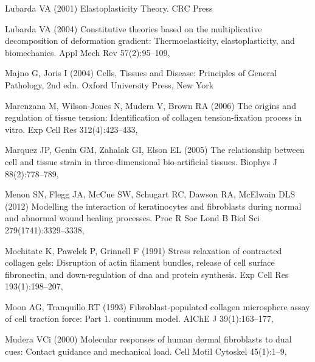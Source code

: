 \begin{thebibliography}{124}
Lubarda VA (2001) Elastoplasticity Theory. CRC Press

Lubarda VA (2004) Constitutive theories based on the multiplicative
  decomposition of deformation gradient: Thermoelasticity, elastoplasticity,
  and biomechanics. Appl Mech Rev 57(2):95--109, 

Majno G, Joris I (2004) Cells, Tissues and Disease: Principles of General
  Pathology, 2nd edn. Oxford University Press, New York

Marenzana M, Wilson-Jones N, Mudera V, Brown RA (2006) The origins and
  regulation of tissue tension: Identification of collagen tension-fixation
  process in vitro. Exp Cell Res 312(4):423--433,

Marquez JP, Genin GM, Zahalak GI, Elson EL (2005) The relationship between cell
  and tissue strain in three-dimensional bio-artificial tissues. Biophys J
  88(2):778--789, 

Menon SN, Flegg JA, McCue SW, Schugart RC, Dawson RA, McElwain DLS (2012)
  Modelling the interaction of keratinocytes and fibroblasts during normal and
  abnormal wound healing processes. Proc R Soc Lond B Biol Sci
  279(1741):3329--3338, 

Mochitate K, Pawelek P, Grinnell F (1991) Stress relaxation of contracted
  collagen gels: {D}isruption of actin filament bundles, release of cell
  surface fibronectin, and down-regulation of dna and protein synthesis. Exp
  Cell Res 193(1):198--207, 

Moon AG, Tranquillo RT (1993) Fibroblast-populated collagen microsphere assay
  of cell traction force: Part 1. continuum model. AIChE J 39(1):163--177,

Mudera VCi (2000) Molecular responses of human dermal fibroblasts to dual cues:
  Contact guidance and mechanical load. Cell Motil Cytoskel 45(1):1--9,


\end{thebibliography}
